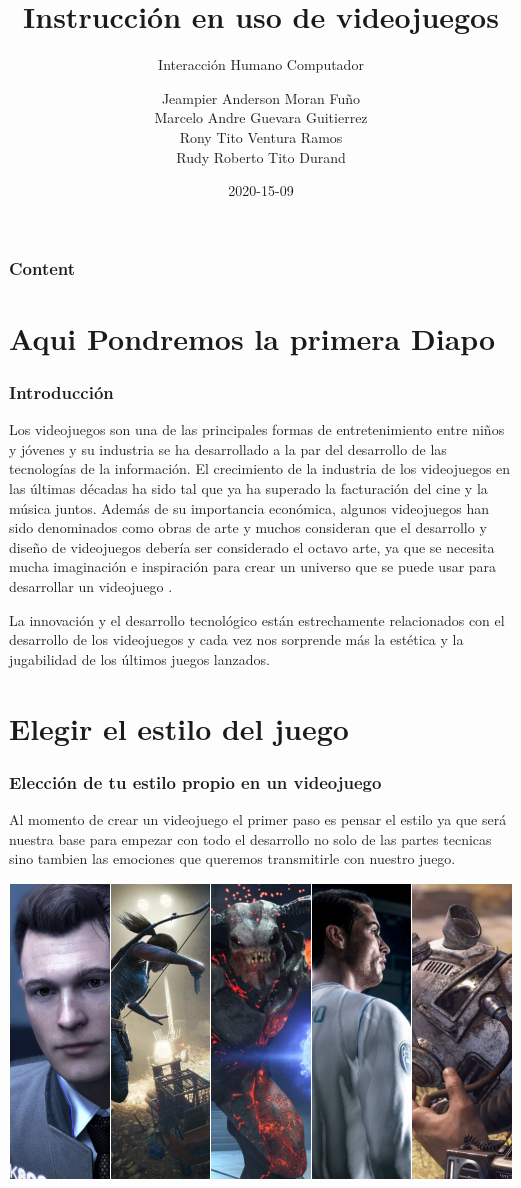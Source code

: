 \documentclass[11pt]{beamer}
\title[Introducción]{\bf\Huge Instrucción en uso de videojuegos}
\subtitle{Interacción Humano Computador}
\author[rescobedoq]
{
	Jeampier Anderson Moran Fuño \inst{1}\\
	Marcelo Andre Guevara Guitierrez\inst{1}\\
	Rony Tito Ventura Ramos\inst{1}\\
	Rudy Roberto Tito Durand\inst{1}
}
\institute[UNSA]
{
\inst{1}%
System Engineering School\\
System Engineering and Informatic Department\\
Production and Services Faculty\\
San Agustin National University of Arequipa
}
\date[2020-15-09]{\scriptsize{2020-15-09}}
\begin{document}
\begin{frame}
\titlepage
\end{frame}

\begin{frame}
\frametitle{Content}
\tableofcontents
\end{frame}

\section{Aqui Pondremos la primera Diapo}
\begin{frame}
\frametitle{Introducción}
Los videojuegos son una de las principales formas de entretenimiento entre niños y jóvenes y su industria se ha desarrollado a la par del desarrollo de las tecnologías de la información. El crecimiento de la industria de los videojuegos en las últimas décadas ha sido tal que ya ha superado la facturación del cine y la música juntos. Además de su importancia económica, algunos videojuegos han sido denominados como obras de arte y muchos consideran que el desarrollo y diseño de videojuegos debería ser considerado el octavo arte, ya que se necesita mucha imaginación e inspiración para crear un universo que se puede usar para desarrollar un videojuego .

La innovación y el desarrollo tecnológico están estrechamente relacionados con el desarrollo de los videojuegos y cada vez nos sorprende más la estética y la jugabilidad de los últimos juegos lanzados.

\end{frame}

\section{Elegir el estilo del juego}
\begin{frame}
\frametitle{Elección de tu estilo propio en un videojuego}
Al momento de crear un videojuego el primer paso es pensar el estilo ya que será nuestra base para empezar con todo el desarrollo no solo de las partes tecnicas sino tambien las emociones que queremos transmitirle con nuestro juego.
\begin{center}
 \includegraphics[scale=0.2,keepaspectratio=true]{img/estilos de juego.jpg}
\end{center}
\end{frame}
\end{document}
